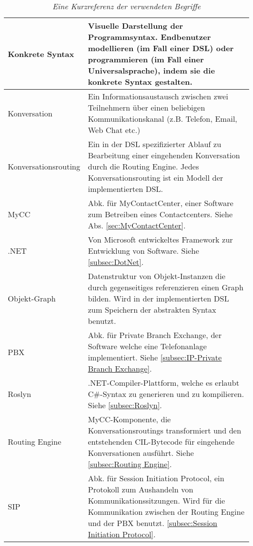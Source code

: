 \begin{table}[hbtp]
\begin{tabulary}{1.0\textwidth}{L|L}
\hline

Konkrete Syntax & Visuelle Darstellung der Programmsyntax. Endbenutzer modellieren (im Fall einer DSL) oder programmieren (im Fall einer Universalsprache), indem sie die konkrete Syntax gestalten.\\

\hline

Konversation & Ein Informationsaustausch zwischen zwei Teilnehmern über einen beliebigen Kommunikationskanal (z.B. Telefon, Email, Web Chat etc.)\\

\hline

Konversationsrouting & Ein in der DSL spezifizierter Ablauf zu Bearbeitung einer eingehenden Konversation durch die Routing Engine. Jedes Konversationsrouting ist ein Modell der implementierten DSL.\\

\hline

MyCC & Abk. für MyContactCenter, einer Software zum Betreiben eines Contactcenters. Siehe Abs. \ref{sec:MyContactCenter}.\\

\hline

.NET & Von Microsoft entwickeltes Framework zur Entwicklung von Software. Siehe \ref{subsec:DotNet}.\\

\hline

Objekt-Graph & Datenstruktur von Objekt-Instanzen die durch gegenseitiges referenzieren einen Graph bilden. Wird in der implementierten DSL zum Speichern der abstrakten Syntax benutzt.\\

\hline

PBX & Abk. für Private Branch Exchange, der Software welche eine Telefonanlage implementiert. Siehe \ref{subsec:IP-Private Branch Exchange}.\\

\hline

Roslyn & .NET-Compiler-Plattform, welche es erlaubt C\#-Syntax zu generieren und zu kompilieren. Siehe \ref{subsec:Roslyn}.\\

\hline

Routing Engine & MyCC-Komponente, die Konversationsroutings transformiert und den entstehenden CIL-Bytecode für eingehende Konversationen ausführt. Siehe \ref{subsec:Routing Engine}.\\

\hline
SIP & Abk. für Session Initiation Protocol, ein Protokoll zum Aushandeln von Kommunikationssitzungen. Wird für die Kommunikation zwischen der Routing Engine und der PBX benutzt. \ref{subsec:Session Initiation Protocol}.  \\

\end{tabulary}
\caption{\textit{Eine Kurzreferenz der verwendeten Begriffe}}
\label{tab:kurzreferenz}
\end{table}